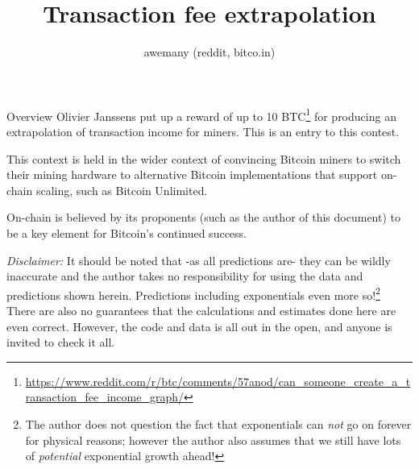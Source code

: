 \documentclass{article}
\title{Transaction fee extrapolation}
\author{awemany (reddit, bitco.in)}
\begin{document}
\maketitle
\begin{section}{Overview}
  Olivier Janssens put up a reward of up to 10
  BTC\footnote{\url{https://www.reddit.com/r/btc/comments/57anod/can_someone_create_a_transaction_fee_income_graph/}}
  for producing an extrapolation of transaction income for miners.  This is an
  entry to this contest.

  This context is held in the wider context of convincing Bitcoin miners to
  switch their mining hardware to alternative Bitcoin implementations that
  support on-chain scaling, such as Bitcoin Unlimited.

  On-chain is believed by its proponents (such as the author of this document)
  to be a key element for Bitcoin's continued success.

  \emph{Disclaimer:} It should be noted that -as all predictions are- they can
  be wildly inaccurate and the author takes no responsibility for using the
  data and predictions shown herein. Predictions including exponentials even
  more so!\footnote{The author does not question the fact that exponentials
    can \emph{not} go on forever for physical reasons; however the author also
    assumes that we still have lots of \emph{potential} exponential growth
    ahead!}  There are also no guarantees that the calculations and estimates
  done here are even correct. However, the code and data is all out in the
  open, and anyone is invited to check it all.
\end{section}
\end{document}
